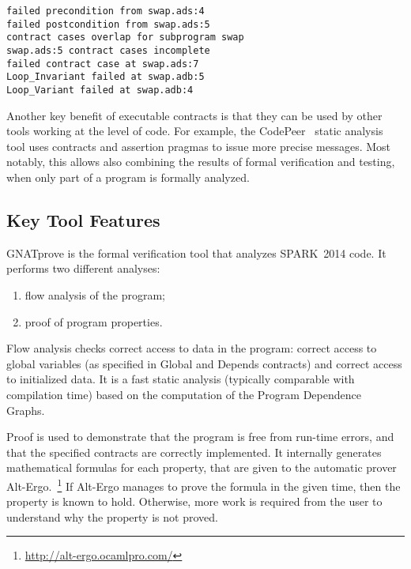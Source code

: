 \documentclass[10pt,a4paper,twocolumn]{article}
\newcommand{\gnatprove}{GNATprove\xspace}
\newcommand{\newspark}{SPARK~2014\xspace}
\newcommand{\altergo}{Alt-Ergo\xspace}
\begin{document}
\begin{footnotesize}
\begin{verbatim}
failed precondition from swap.ads:4
failed postcondition from swap.ads:5
contract cases overlap for subprogram swap
swap.ads:5 contract cases incomplete
failed contract case at swap.ads:7
Loop_Invariant failed at swap.adb:5
Loop_Variant failed at swap.adb:4
\end{verbatim}
\end{footnotesize}

Another key benefit of executable contracts is that they can be used by other
tools working at the level of code. For example, the CodePeer~\cite{codepeer}
static analysis tool uses contracts and assertion pragmas to issue more precise
messages. Most notably, this allows also combining the results of formal
verification and testing, when only part of a program is formally
analyzed.~\cite{hiliteERTS2012}

\subsection{Key Tool Features}

\gnatprove is the formal verification tool that analyzes \newspark code. It
performs two different analyses:

\begin{enumerate}
\item flow analysis of the program;
\item proof of program properties.
\end{enumerate}

Flow analysis checks correct access to data in the program: correct access to
global variables (as specified in Global and Depends contracts) and correct
access to initialized data. It is a fast static analysis (typically comparable
with compilation time) based on the computation of the Program Dependence
Graphs.~\cite{Horwitz:1988:ISU:53990.53994}

Proof is used to demonstrate that the program is free from run-time errors, and
that the specified contracts are correctly implemented. It internally generates
mathematical formulas for each property, that are given to the automatic prover
\altergo.~\footnote{\url{http://alt-ergo.ocamlpro.com/}} If \altergo manages to
prove the formula in the given time, then the property is known to
hold. Otherwise, more work is required from the user to understand why the
property is not proved. 
\end{document}
